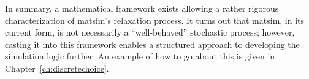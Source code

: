 
In summary, a mathematical framework exists allowing a rather
rigorous characterization of  \gls{matsim}'s relaxation
process.
It turns out that \gls{matsim}, in its current form, is not necessarily a ``well-behaved''
stochastic process; however, casting it into this framework enables a structured
approach to developing the simulation logic further. An example of how to go
about this is given in Chapter~\ref{ch:discretechoice}.





